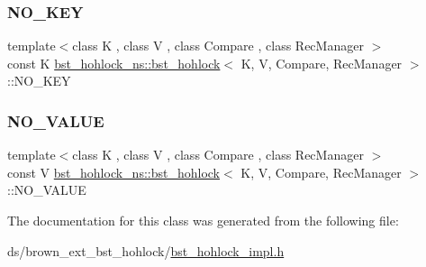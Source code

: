 \subsubsection{\texorpdfstring{N\+O\+\_\+\+K\+EY}{NO\_KEY}}
{\footnotesize\ttfamily template$<$class K , class V , class Compare , class Rec\+Manager $>$ \\
const K \hyperlink{classbst__hohlock__ns_1_1bst__hohlock}{bst\+\_\+hohlock\+\_\+ns\+::bst\+\_\+hohlock}$<$ K, V, Compare, Rec\+Manager $>$\+::N\+O\+\_\+\+K\+EY}

\mbox{\label{classbst__hohlock__ns_1_1bst__hohlock_afec4f903fbecace7935e53e614982b20}} 
\subsubsection{\texorpdfstring{N\+O\+\_\+\+V\+A\+L\+UE}{NO\_VALUE}}
{\footnotesize\ttfamily template$<$class K , class V , class Compare , class Rec\+Manager $>$ \\
const V \hyperlink{classbst__hohlock__ns_1_1bst__hohlock}{bst\+\_\+hohlock\+\_\+ns\+::bst\+\_\+hohlock}$<$ K, V, Compare, Rec\+Manager $>$\+::N\+O\+\_\+\+V\+A\+L\+UE}



The documentation for this class was generated from the following file\+:\begin{DoxyCompactItemize}
\item 
ds/brown\+\_\+ext\+\_\+bst\+\_\+hohlock/\hyperlink{bst__hohlock__impl_8h}{bst\+\_\+hohlock\+\_\+impl.\+h}\end{DoxyCompactItemize}
